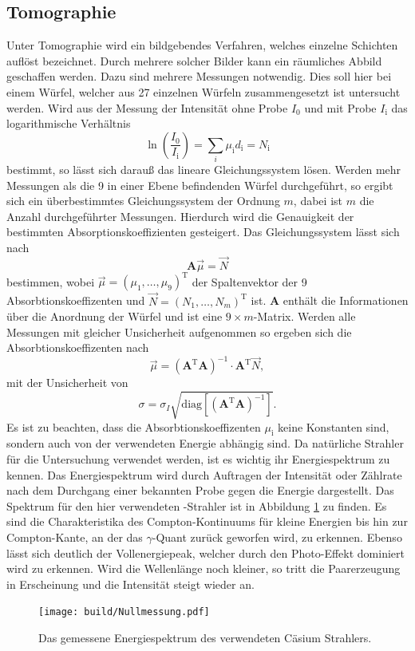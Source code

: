 \subsection{Tomographie}
\label{sec:Tomo}
Unter Tomographie wird ein bildgebendes Verfahren, welches einzelne Schichten auflöst bezeichnet. Durch mehrere solcher Bilder kann ein räumliches 
Abbild geschaffen werden. Dazu sind mehrere Messungen notwendig.
Dies soll hier bei einem Würfel, welcher aus \num{27} einzelnen Würfeln zusammengesetzt ist untersucht werden.
Wird aus der Messung der Intensität ohne Probe $I_0$ und mit Probe $I_\text{i}$ das logarithmische Verhältnis
\begin{equation}
    \label{eqn:Verhältnis}
    \ln\left(\frac{I_0}{I_\text{i}}\right) = \sum_i \mu_\text{i} d_\text{i} = N_\text{i}
\end{equation}
bestimmt, so lässt sich darauß das lineare Gleichungssystem lösen. Werden mehr Messungen als die \num{9} in einer Ebene befindenden Würfel durchgeführt, 
so ergibt sich ein überbestimmtes Gleichungssystem der Ordnung $m$, dabei ist $m$ die Anzahl durchgeführter Messungen.
Hierdurch wird die Genauigkeit der bestimmten Absorptionskoeffizienten gesteigert.
Das Gleichungssystem lässt sich nach
\begin{equation}
    \label{eqn:Gleichungssystem}
    \textbf{A} \vec{\mu} = \vec{N}
\end{equation}
bestimmen, wobei $\vec{\mu} = (\mu_1, \ldots,\mu_9)^\text{T}$ der Spaltenvektor der \num{9} Absorbtionskoeffizenten und $\vec{N} = (N_1, \ldots,N_m)^\text{T}$ ist. 
\textbf{A} enthält die Informationen über die Anordnung der Würfel und ist eine $9 \times m$-Matrix. Werden alle Messungen mit gleicher Unsicherheit 
aufgenommen so ergeben sich die Absorbtionskoeffizenten nach
\begin{equation}
    \label{eqn:Absorbtionskoeffizenten}
    \vec{\mu} = (\textbf{A}^\text{T} \textbf{A})^{-1} \cdot \textbf{A}^\text{T} \vec{N},
\end{equation}
mit der Unsicherheit von
\begin{equation}
    \label{eqn:Unsicherheit}
    \sigma = \sigma_I\sqrt{\text{diag}[(\textbf{A}^\text{T} \textbf{A})^{-1}]}.
\end{equation}
Es ist zu beachten, dass die Absorbtionskoeffizenten $\mu_\text{i}$ keine Konstanten sind, sondern auch von der verwendeten Energie abhängig sind. 
Da natürliche Strahler für die Untersuchung verwendet werden, ist es wichtig ihr Energiespektrum zu kennen. Das Energiespektrum wird durch Auftragen der 
Intensität oder Zählrate nach dem Durchgang einer bekannten Probe gegen die Energie dargestellt. Das Spektrum für den hier verwendeten -Strahler ist in Abbildung \ref{fig:spektrum} zu finden.
Es sind die Charakteristika des Compton-Kontinuums für kleine Energien bis hin zur Compton-Kante, an der das $\gamma$-Quant zurück geworfen wird, zu erkennen. 
Ebenso lässt sich deutlich der Vollenergiepeak, welcher durch den Photo-Effekt dominiert wird zu erkennen. Wird die Wellenlänge noch kleiner, so tritt die Paarerzeugung
in Erscheinung und die Intensität steigt wieder an.

 \begin{figure}
   \centering
   \texttt{[image: build/Nullmessung.pdf]}
   \caption{Das gemessene Energiespektrum des verwendeten Cäsium Strahlers.}
   \label{fig:spektrum}
 \end{figure}
